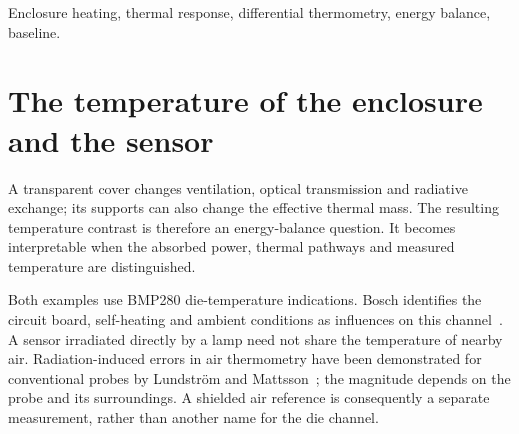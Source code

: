 \begin{abstract}
A temperature-rise curve combines the response of an enclosure with the thermal state of the sensor inside it. Paired open and covered examples give late-heating rises of 3.566 and 6.787~K, an additional covered-vessel rise of 3.221~K. Their fitted apparent time constants are 179 and 150~s. A separate single-sensor example gives a 5.292-K late rise and a 149.7-s heating response. Together, the examples distinguish a measured baseline from an entered reference, a simultaneous difference from a sequential comparison, and an empirical response time from an identifiable heat-loss coefficient. Upward changes at nominal lamp-off prevent a continuous single-node interpretation across that boundary. Controlled source power, reproducible mounting and independent air thermometry determine which physical explanation a warming contrast can support.
\end{abstract}
\begin{IEEEkeywords}
Enclosure heating, thermal response, differential thermometry, energy balance, baseline.
\end{IEEEkeywords}

\section{The temperature of the enclosure and the sensor}
A transparent cover changes ventilation, optical transmission and radiative exchange; its supports can also change the effective thermal mass. The resulting temperature contrast is therefore an energy-balance question. It becomes interpretable when the absorbed power, thermal pathways and measured temperature are distinguished.

Both examples use BMP280 die-temperature indications. Bosch identifies the circuit board, self-heating and ambient conditions as influences on this channel~\cite{bmp280}. A sensor irradiated directly by a lamp need not share the temperature of nearby air. Radiation-induced errors in air thermometry have been demonstrated for conventional probes by Lundstr\"om and Mattsson~\cite{lundstrom2020}; the magnitude depends on the probe and its surroundings. A shielded air reference is consequently a separate measurement, rather than another name for the die channel.

